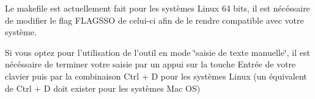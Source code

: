 \begin{DoxyEnumerate}
\item Le makefile est actuellement fait pour les systèmes Linux 64 bits, il est nécéssaire de modifier le flag F\-L\-A\-G\-S\-S\-O de celui-\/ci afin de le rendre compatible avec votre système.
\item Si vous optez pour l'utilisation de l'outil en mode \char`\"{}saisie de texte manuelle\char`\"{}, il est nécéssaire de terminer votre saisie par un appui sur la touche Entrée de votre clavier puis par la combinaison Ctrl + D pour les systèmes Linux (un équivalent de Ctrl + D doit exister pour les systèmes Mac O\-S) 
\end{DoxyEnumerate}
